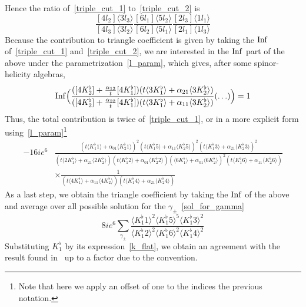 Hence the ratio of~\cref{triple_cut_1} to~\cref{triple_cut_2} is
\begin{equation}
\frac{[4l_2]\langle 3l_3\rangle}{[4l_3]\langle 3l_2\rangle}
\frac{[6l_1]\langle 5l_2\rangle}{[6l_2]\langle 5l_1\rangle}
\frac{[2l_3]\langle 1l_1\rangle}{[2l_1]\langle 1l_3\rangle}
\end{equation}
\fi
%
Because the contribution to triangle coefficient is given by taking the $\mathrm{Inf}$ of~\cref{triple_cut_1} and~\cref{triple_cut_2}, we are interested in the $\mathrm{Inf}$ part of the above under the parametrization~\cref{l_param}, which gives, after some spinor-helicity algebras,
\begin{equation}
\mathrm{Inf}\Big(\frac{([4K_2^\flat] + \frac{\alpha_{12}}{t}[4K_1^\flat])(t\langle 3K_1^\flat \rangle + \alpha_{21}\langle 3K_2^\flat\rangle)}{([4K_2^\flat] + \frac{\alpha_{22}}{t}[4K_1^\flat])(t\langle 3K_1^\flat \rangle + \alpha_{11}\langle 3K_2^\flat\rangle)}(\ldots)\Big)
= 1
\end{equation} 
%
Thus, the total contribution is twice of~\ref{triple_cut_1}, or in a more explicit form using~\cref{l_param}\footnote{
Note that here we apply an offset of one to the indices \wrt the previous notation.
}
\begin{equation}
\begin{split}
-16ie^6 & \frac{(t\langle K_1^\flat 1 \rangle + \alpha_{01}\langle K_2^\flat 1\rangle)^2
(t\langle K_1^\flat 5 \rangle + \alpha_{11}\langle K_2^\flat 5\rangle)^2
(t\langle K_1^\flat 3 \rangle + \alpha_{21}\langle K_2^\flat 3\rangle)^2
}{
(t\langle 2K_1^\flat  \rangle + \alpha_{21}\langle 2 K_2^\flat \rangle)
(t\langle K_1^\flat 2 \rangle + \alpha_{01}\langle K_2^\flat 2\rangle)
(\langle  6K_1^\flat  \rangle + \alpha_{01}\langle  6K_2^\flat \rangle)^2
(t\langle K_1^\flat 6 \rangle + \alpha_{11}\langle K_2^\flat 6\rangle)}
\\
&\times
\frac{1}{
(t\langle 4K_1^\flat  \rangle + \alpha_{11}\langle 4 K_2^\flat \rangle)
(t\langle K_1^\flat 4 \rangle + \alpha_{21}\langle K_2^\flat 4 \rangle)
}
\end{split}
\end{equation}
As a last step, we obtain the triangle coefficient by taking the $\mathrm{Inf}$ of the above and average over all possible solution for the $\gamma_\pm$~\cref{sol_for_gamma}
\begin{equation}
8ie^6\sum_{\gamma_\pm}\frac{\langle K_1^\flat 1 \rangle^2\langle K_1^\flat 5\rangle^5 \langle K_1^\flat 3 \rangle^2}{\langle K_1^\flat 2 \rangle^2\langle K_1^\flat 6\rangle^2 \langle K_1^\flat 4 \rangle^2}
\end{equation}
Substituting $K_1^\flat$ by its expression~\cref{k_flat}, we obtain an agreement with the result found in~\cite{Forde:2007mi} up to a factor due to the convention.










